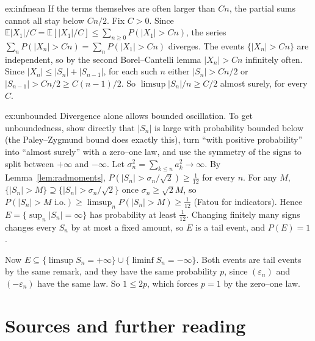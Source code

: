 \begin{solution}{ex:infmean}
\idea If the terms themselves are often larger than $Cn$, the partial sums cannot all stay below $Cn/2$.
\writeup Fix $C>0$. Since $\mathbb E|X_1|/C=\mathbb E[|X_1|/C]\le\sum_{n\ge0}P(|X_1|>Cn)$, the series $\sum_nP(|X_n|>Cn)=\sum_nP(|X_1|>Cn)$ diverges.
The events $\{|X_n|>Cn\}$ are independent, so by the second Borel--Cantelli lemma $|X_n|>Cn$ infinitely often. Since $|X_n|\le|S_n|+|S_{n-1}|$,
for each such $n$ either $|S_n|>Cn/2$ or $|S_{n-1}|>Cn/2\ge C(n-1)/2$. So $\limsup|S_n|/n\ge C/2$ almost surely, for every $C$.
\end{solution}

\begin{solution}{ex:unbounded}
\idea Divergence alone allows bounded oscillation. To get unboundedness, show directly that $|S_n|$ is large with probability bounded below
(the Paley--Zygmund bound does exactly this), turn ``with positive probability'' into ``almost surely'' with a zero--one law, and use the symmetry
of the signs to split between $+\infty$ and $-\infty$.
\writeup Let $\sigma_n^2=\sum_{k\le n}a_k^2\to\infty$. By Lemma~\ref{lem:radmoments}, $P(|S_n|>\sigma_n/\sqrt2)\ge\frac1{12}$ for every $n$. For any
$M$, $\{|S_n|>M\}\supseteq\{|S_n|>\sigma_n/\sqrt2\}$ once $\sigma_n\ge\sqrt2M$, so $P(|S_n|>M\text{ i.o.})\ge\limsup_nP(|S_n|>M)\ge\frac1{12}$ (Fatou
for indicators). Hence $E=\{\sup_n|S_n|=\infty\}$ has probability at least $\frac1{12}$. Changing finitely many signs changes every $S_n$ by at most a
fixed amount, so $E$ is a tail event, and $P(E)=1$.

Now $E\subseteq\{\limsup S_n=+\infty\}\cup\{\liminf S_n=-\infty\}$. Both events are tail events by the same remark, and they have the same probability
$p$, since $(\varepsilon_n)$ and $(-\varepsilon_n)$ have the same law. So $1\le2p$, which forces $p=1$ by the zero--one law.
\end{solution}

\section*{Sources and further reading}

